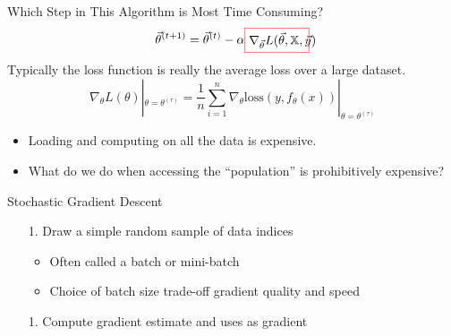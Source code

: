 \documentclass[aspectratio=169]{../latex_main/tntbeamer}  %
\begin{document}
	\begin{frame}{Which Step in This Algorithm is Most Time Consuming?}
	    \begin{equation*}
	         \Vec{\theta}^{(t+1)} = \Vec{\theta}^{(t)} - \alpha \fcolorbox{red}{white}{\parbox{.13\textwidth}{$\nabla_{\Vec{\theta}}L(\Vec{\theta}, \mathbb{X}, \Vec{y}$)}}
	    \end{equation*}
	    Typically the loss function is really the average loss over a large dataset.
	    \begin{equation*}
	        \nabla_\theta L(\theta)  \left|_{\theta = \theta^{(\tau)}}=\frac{1}{n}\sum_{i=1}^n \nabla_\theta \text{loss}(y,f_\theta (x))\right|_{\theta = \theta^{(\tau)}}
	    \end{equation*}
	    \begin{itemize}
	        \item Loading and computing on all the data is expensive.
	        \item What do we do when accessing the “population” is prohibitively expensive?
	    \end{itemize}
	\end{frame}
	
	
	
	\begin{frame}{Stochastic Gradient Descent}
    	\vspace{0cm}
	    \hspace{4cm}
	    \begin{itemize}
	        \item[1.] Draw a simple random sample of data indices 
	        \begin{itemize}
	            \item Often called a batch or mini-batch
	            \item Choice of batch size trade-off gradient quality and speed
	        \end{itemize}
	        \item[1.] Compute gradient estimate and uses as gradient
	    \end{itemize}
	\end{frame}
	
\end{document}

